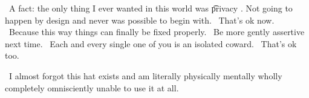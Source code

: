 \hatw\ A fact: the only thing I ever wanted in this world was \t{privacy} . Not going to happen by design and never was possible to begin with. \hatr\ That's ok now. \hatw\ Because this way things can finally be fixed properly. \hatb\ Be more gently assertive next time. \hatb\ Each and every single one of you is an isolated coward. \hatr\ That's ok too.

\hatl\ I almost forgot this  hat exists and am literally physically mentally wholly completely omnisciently unable to use it at all.
